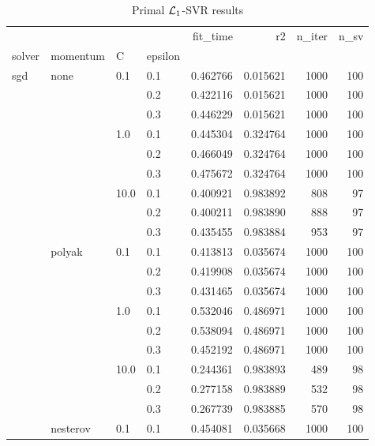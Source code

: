 \begin{table}[H]
\centering
\caption{Primal $\protect \mathcal{L}_1$-SVR results}
\label{primal_l1_svr_cv_results}
\begin{tabular}{llllrrrr}
\toprule
          &   &      &     &  fit\_time &        r2 &  n\_iter &  n\_sv \\
solver & momentum & C & epsilon &           &           &         &       \\
\midrule
sgd & none & 0.1  & 0.1 &  0.462766 &  0.015621 &    1000 &   100 \\
          &   &      & 0.2 &  0.422116 &  0.015621 &    1000 &   100 \\
          &   &      & 0.3 &  0.446229 &  0.015621 &    1000 &   100 \\
          &   & 1.0  & 0.1 &  0.445304 &  0.324764 &    1000 &   100 \\
          &   &      & 0.2 &  0.466049 &  0.324764 &    1000 &   100 \\
          &   &      & 0.3 &  0.475672 &  0.324764 &    1000 &   100 \\
          &   & 10.0 & 0.1 &  0.400921 &  0.983892 &     808 &    97 \\
          &   &      & 0.2 &  0.400211 &  0.983890 &     888 &    97 \\
          &   &      & 0.3 &  0.435455 &  0.983884 &     953 &    97 \\
          & polyak & 0.1  & 0.1 &  0.413813 &  0.035674 &    1000 &   100 \\
          &   &      & 0.2 &  0.419908 &  0.035674 &    1000 &   100 \\
          &   &      & 0.3 &  0.431465 &  0.035674 &    1000 &   100 \\
          &   & 1.0  & 0.1 &  0.532046 &  0.486971 &    1000 &   100 \\
          &   &      & 0.2 &  0.538094 &  0.486971 &    1000 &   100 \\
          &   &      & 0.3 &  0.452192 &  0.486971 &    1000 &   100 \\
          &   & 10.0 & 0.1 &  0.244361 &  0.983893 &     489 &    98 \\
          &   &      & 0.2 &  0.277158 &  0.983889 &     532 &    98 \\
          &   &      & 0.3 &  0.267739 &  0.983885 &     570 &    98 \\
          & nesterov & 0.1  & 0.1 &  0.454081 &  0.035668 &    1000 &   100 \\

\end{tabular}
\end{table}
